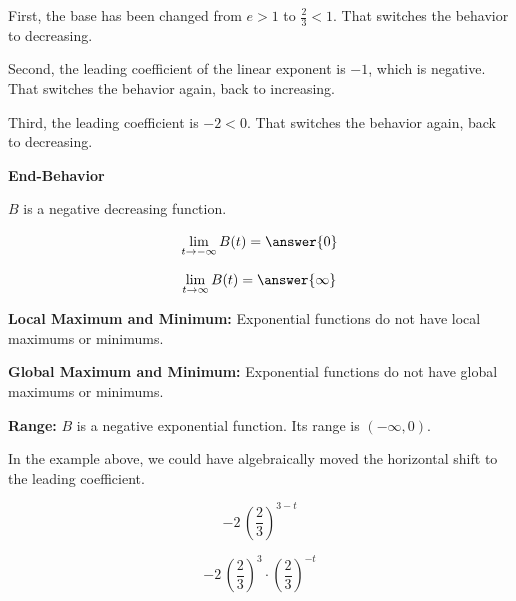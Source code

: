 \documentclass{ximera}
\begin{document}
\begin{example}
First, the base has been changed from $e > 1$ to $\frac{2}{3} < 1$.  That switches the behavior to decreasing.

Second, the leading coefficient of the linear exponent is $-1$, which is negative.  That switches the behavior again, back to increasing.


Third, the leading coefficient is $-2 < 0$. That switches the behavior again, back to decreasing.







\textbf{End-Behavior}


$B$ is a negative decreasing function.



\[
\lim\limits_{t \to -\infty}B(t) = \answer{0}  
\]

\[
\lim\limits_{t \to \infty}B(t) = \answer{\infty}
\]





\textbf{Local Maximum and Minimum:}  Exponential functions do not have local maximums or minimums.






\textbf{Global Maximum and Minimum:}  Exponential functions do not have global maximums or minimums.




\textbf{Range:}  $B$ is a negative exponential function.   Its range is $(-\infty, 0)$.







\end{example}

























In the example above, we could have algebraically moved the horizontal shift to the leading coefficient.



\[
-2 \, \left( \frac{2}{3} \right)^{3-t}
\]


\[
-2 \, \left( \frac{2}{3} \right)^{3} \cdot \left( \frac{2}{3} \right)^{-t}
\]
\end{document}
